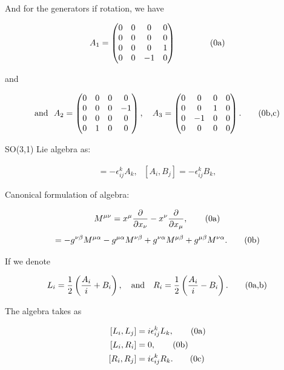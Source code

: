 \documentclass[12pt]{beamer}
\newcommand{\stag}[1]{\tag{\arabic{equation}#1}}
\begin{document}
\begin{frame}
And for the generators if rotation, we have

\addtocounter{equation}{1}
\begin{align*}
A_1=\begin{pmatrix}
0&0&0&0\\
0&0&0&0\\
0&0&0&1\\
0&0&-1&0\end{pmatrix}~~~~~~\stag{a}
\end{align*} 

\noindent and

\begin{align*}
\mbox{and}~~A_2=\begin{pmatrix}
0&0&0&0\\
0&0&0&-1\\
0&0&0&0\\
0&1&0&0\end{pmatrix},~~~
A_3=\begin{pmatrix}
0&0&0&0\\
0&0&1&0\\
0&-1&0&0\\
0&0&0&0\end{pmatrix}.\stag{b,c}
\end{align*}
\end{frame}
\begin{frame}
SO(3,1) Lie algebra as:

\begin{align}
[A_i,A_j]=-\epsilon_{ij}^kA_k,~~~[A_i,B_j]=-\epsilon_{ij}^kB_k,
\end{align}

Canonical formulation of algebra:

\addtocounter{equation}{+1}
\begin{align*}
M^{\mu\nu}=x^{\mu}\frac{\partial}{\partial x_\nu}-x^{\nu}\frac{\partial}{\partial x_\mu},\stag{a}
\end{align*}
\begin{align*}
[M^{\mu\nu},M^{\alpha\beta}]=-g^{\nu\beta}M^{\mu\alpha}-g^{\mu\alpha}M^{\nu\beta}
+g^{\nu\alpha}M^{\mu\beta}+g^{\mu\beta}M^{\nu\alpha}.\stag{b}
\end{align*}
\end{frame}


\begin{frame}
If we denote

\addtocounter{equation}{1}
\begin{align*}
L_i=\frac{1}{2}\left(\frac{A_i}{i}+B_i\right),~~~\mbox{and}~~~R_i=\frac{1}{2}\left(\frac{A_i}{i}-B_i\right).\stag{a,b}
\end{align*}

The algebra takes as

\addtocounter{equation}{1}
\begin{align*}
\notag[L_i,L_j]&=i\epsilon^k_{ij}L_k,\stag{a}\\
\notag[L_i,R_i]&=0,\stag{b}\\
[R_i,R_j]&=i\epsilon^k_{ij}R_k.\stag{c}
\end{align*} 
\end{frame}
\end{document}

